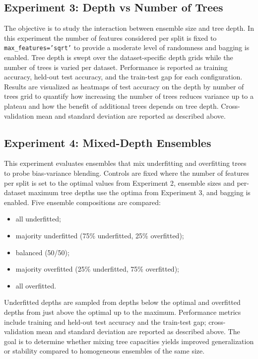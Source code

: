 \documentclass[conference]{IEEEtran}
\begin{document}
\subsection{Experiment 3: Depth vs Number of Trees}
The objective is to study the interaction between ensemble size and tree depth. In this experiment the number of features considered per split is fixed
 to \texttt{max\_features='sqrt'} to provide a moderate level of randomness and bagging is enabled. Tree depth is swept over the dataset-specific depth grids while the number of
  trees is varied per dataset. Performance is reported as training accuracy, held-out test accuracy, and the train-test gap for each configuration. Results are visualized as heatmaps of test accuracy on the depth by number of trees grid to quantify how increasing the number of trees reduces variance up to a plateau and how the benefit of additional trees depends on tree depth. Cross-validation mean and standard deviation are reported as described above.

\subsection{Experiment 4: Mixed-Depth Ensembles}
This experiment evaluates ensembles that mix underfitting and overfitting trees to probe bias-variance blending. Controls are fixed where the number of 
features per split is set to the optimal values from Experiment 2, ensemble sizes and per-dataset maximum tree depths use the optima from Experiment 3, and bagging is enabled. 
Five ensemble compositions are compared:
\begin{itemize}
  \item all underfitted;
  \item majority underfitted (75\% underfitted, 25\% overfitted);
  \item balanced (50/50);
  \item majority overfitted (25\% underfitted, 75\% overfitted);
  \item all overfitted. 
\end{itemize}
Underfitted depths are sampled from depths below the optimal and overfitted depths from just above the optimal up to the maximum.
Performance metrics include training and held-out test accuracy and the train-test gap; cross-validation mean and standard deviation are reported as described above. The goal is to determine whether mixing tree capacities yields improved generalization or stability compared to homogeneous ensembles of the same size.
\end{document}
